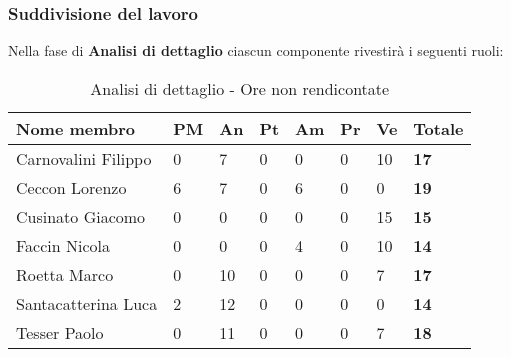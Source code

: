 		\subsubsection{Suddivisione del lavoro} %
		\label{ssub:suddivisione_del_lavoro}
		Nella fase di \textbf{Analisi di dettaglio} ciascun componente rivestirà i seguenti ruoli: \\
			\begin{table}[!ht]
				\begin{center}
					\begin{tabularx}{0.9\textwidth}{|l|l|l|l|l|l|l|X|}
						\hline
						\textbf{Nome membro} & \textbf{PM} & \textbf{An} & \textbf{Pt} & \textbf{Am} & \textbf{Pr} & \textbf{Ve} & \textbf{Totale} \\
						\hline
						Carnovalini Filippo & 0 & 7 & 0 & 0 & 0 & 10 & \textbf{17} \\
						\hline
						Ceccon Lorenzo & 6 & 7 & 0 & 6 & 0 & 0 & \textbf{19} \\
						\hline
						Cusinato Giacomo & 0 & 0 & 0 & 0 & 0 & 15 & \textbf{15} \\
						\hline
						Faccin Nicola & 0 & 0 & 0 & 4 & 0 & 10 & \textbf{14} \\
						\hline
						Roetta Marco & 0 & 10 & 0 & 0 & 0 & 7 & \textbf{17} \\
						\hline
						Santacatterina Luca & 2 & 12 & 0 & 0 & 0 & 0 & \textbf{14} \\
						\hline
						Tesser Paolo & 0 & 11 & 0 & 0 & 0 & 7 & \textbf{18} \\
						\hline	
					\end{tabularx}
				\end{center}
			\caption{Analisi di dettaglio - Ore non rendicontate}
			\end{table}
			
